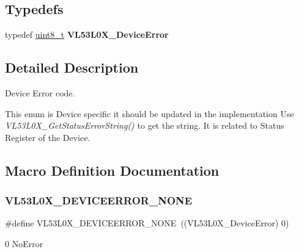 \subsection*{Typedefs}
\begin{DoxyCompactItemize}
\item 
\mbox{\label{group__VL53L0X__DeviceError__group_ga25f8b4de6943ec6f55a0a8319ef7e025}} 
typedef \hyperlink{vl53l0x__types_8h_aba7bc1797add20fe3efdf37ced1182c5}{uint8\+\_\+t} {\bfseries V\+L53\+L0\+X\+\_\+\+Device\+Error}
\end{DoxyCompactItemize}


\subsection{Detailed Description}
Device Error code. 

This enum is Device specific it should be updated in the implementation Use {\itshape V\+L53\+L0\+X\+\_\+\+Get\+Status\+Error\+String()} to get the string. It is related to Status Register of the Device. 

\subsection{Macro Definition Documentation}
\mbox{\label{group__VL53L0X__DeviceError__group_gada232800eb73d4e8ef6fb2ca506f7030}} 
\subsubsection{\texorpdfstring{V\+L53\+L0\+X\+\_\+\+D\+E\+V\+I\+C\+E\+E\+R\+R\+O\+R\+\_\+\+N\+O\+NE}{VL53L0X\_DEVICEERROR\_NONE}}
{\footnotesize\ttfamily \#define V\+L53\+L0\+X\+\_\+\+D\+E\+V\+I\+C\+E\+E\+R\+R\+O\+R\+\_\+\+N\+O\+NE~((V\+L53\+L0\+X\+\_\+\+Device\+Error) 0)}

0 No\+Error 